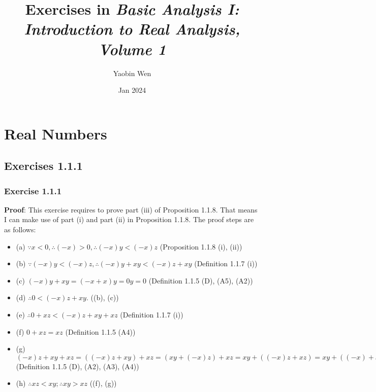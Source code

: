 \documentclass[12pt, letterpaper, oneside]{book}
\title{Exercises in \textit{Basic Analysis I: Introduction to Real Analysis, Volume 1}}
\author{Yaobin Wen}
\date{Jan 2024}
\begin{document}
\maketitle
\tableofcontents

%
%

\chapter{Real Numbers}

\section{Exercises 1.1.1}

\subsection{Exercise 1.1.1}

\textbf{Proof}: This exercise requires to prove part (iii) of Proposition 1.1.8. That means I can make use of part (i)
and part (ii) in Proposition 1.1.8. The proof steps are as follows:
\begin{itemize}
  \item (a) $\because x < 0, \therefore (-x) > 0, \therefore (-x)y < (-x)z$ (Proposition 1.1.8 (i), (ii))
  \item (b) $\because (-x)y < (-x)z, \therefore (-x)y + xy < (-x)z + xy$ (Definition 1.1.7 (i))
  \item (c) $(-x)y + xy = (-x + x)y = 0y = 0$ (Definition 1.1.5 (D), (A5), (A2))
  \item (d) $\therefore 0 < (-x)z + xy$. ((b), (c))
  \item (e) $\therefore 0 + xz < (-x)z + xy + xz$ (Definition 1.1.7 (i))
  \item (f) $0 + xz = xz$ (Definition 1.1.5 (A4))
  \item (g) $(-x)z + xy + xz = \left((-x)z + xy\right) + xz = \left(xy + (-x)z\right) + xz =
          xy + \left((-x)z + xz \right) = xy + \left((-x) + x\right)z = xy + 0z = xy + 0 = xy$ (Definition 1.1.5 (D),
        (A2), (A3), (A4))
  \item (h) $\therefore xz < xy; \therefore xy > xz$ ((f), (g))
\end{itemize}
\end{document}
